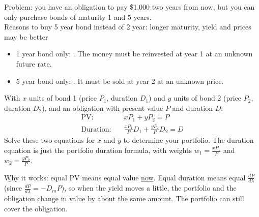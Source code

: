 \b{Problem}: you have an obligation to pay \$1,000 two years from now, but you can only purchase bonds of maturity 1 and 5 years.
\\Reasons to buy 5 year bond instead of 2 year: longer maturity, yield and prices may be better
\begin{itemize}
    \item 1 year bond only: . The money must be reinvested at year 1 at an unknown future rate.
    \item 5 year bond only: . It must be sold at year 2 at an unknown price.
\end{itemize}

\begin{center}
\end{center}


With $x$ units of bond 1 (price $P_1$, duration $D_1$) and $y$ units of bond 2 (price $P_2$, duration $D_2$), and an obligation with present value $P$ and duration $D$:
\[\boxed{\begin{aligned}
    \text{PV:} &\quad xP_1 + yP_2 = P\\
    \text{Duration:} &\quad \frac{xP_1}{P}D_1 + \frac{yP_2}{P}D_2 = D
\end{aligned}}\]
Solve these two equations for $x$ and $y$ to determine your portfolio. The duration equation is just the portfolio duration formula, with weights $w_1 = \frac{xP_1}{P}$ and $w_2 = \frac{yP_2}{P}$.

\b{Why it works}: equal PV means equal value \ul{now}. Equal duration means equal $\frac{dP}{d\lambda}$ (since $\frac{dP}{d\lambda} = -D_mP$), so when the yield moves a little, the portfolio and the obligation \ul{change in value by about the same amount}. The portfolio can still cover the obligation.

